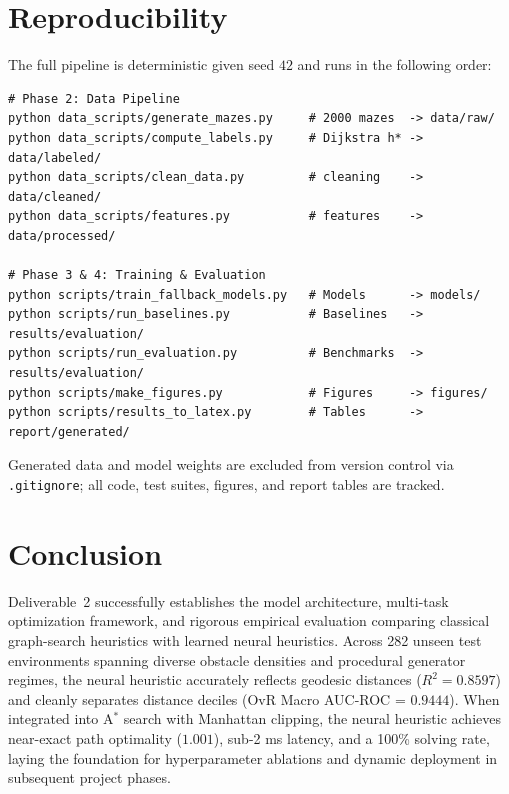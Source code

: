 \documentclass[11pt]{article}
\begin{document}
\section{Reproducibility}
The full pipeline is deterministic given seed $42$ and runs in the following order:

\begin{verbatim}
# Phase 2: Data Pipeline
python data_scripts/generate_mazes.py     # 2000 mazes  -> data/raw/
python data_scripts/compute_labels.py     # Dijkstra h* -> data/labeled/
python data_scripts/clean_data.py         # cleaning    -> data/cleaned/
python data_scripts/features.py           # features    -> data/processed/

# Phase 3 & 4: Training & Evaluation
python scripts/train_fallback_models.py   # Models      -> models/
python scripts/run_baselines.py           # Baselines   -> results/evaluation/
python scripts/run_evaluation.py          # Benchmarks  -> results/evaluation/
python scripts/make_figures.py            # Figures     -> figures/
python scripts/results_to_latex.py        # Tables      -> report/generated/
\end{verbatim}

Generated data and model weights are excluded from version control via
\texttt{.gitignore}; all code, test suites, figures, and report tables are tracked.

\section{Conclusion}
Deliverable~2 successfully establishes the model architecture, multi-task optimization
framework, and rigorous empirical evaluation comparing classical graph-search heuristics
with learned neural heuristics. Across 282 unseen test environments spanning diverse obstacle
densities and procedural generator regimes, the neural heuristic accurately reflects geodesic
distances ($R^2 = 0.8597$) and cleanly separates distance deciles (OvR Macro AUC-ROC = $0.9444$).
When integrated into A$^\ast$ search with Manhattan clipping, the neural heuristic achieves
near-exact path optimality ($1.001$), sub-2 ms latency, and a 100\% solving rate, laying the
foundation for hyperparameter ablations and dynamic deployment in subsequent project phases.
\end{document}
